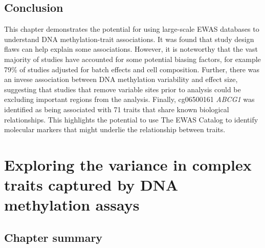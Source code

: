 \documentclass[11pt,twoside]{bristolthesis}
\begin{document}
\hypertarget{conclusion-04}{%
\section{Conclusion}\label{conclusion-04}}

This chapter demonstrates the potential for using large-scale EWAS databases to understand DNA methylation-trait associations. It was found that study design flaws can help explain some associations. However, it is noteworthy that the vast majority of studies have accounted for some potential biasing factors, for example 79\% of studies adjusted for batch effects and cell composition. Further, there was an invese association between DNA methylation variability and effect size, suggesting that studies that remove variable sites prior to analysis could be excluding important regions from the analysis. Finally, cg06500161 \emph{ABCG1} was identified as being associated with 71 traits that share known biological relationships. This highlights the potential to use The EWAS Catalog to identify molecular markers that might underlie the relationship between traits.

\hypertarget{h2ewas-chapter}{%
\chapter{Exploring the variance in complex traits captured by DNA methylation assays}\label{h2ewas-chapter}}

\hypertarget{chapter-summary-05}{%
\section{Chapter summary}\label{chapter-summary-05}}
\end{document}
